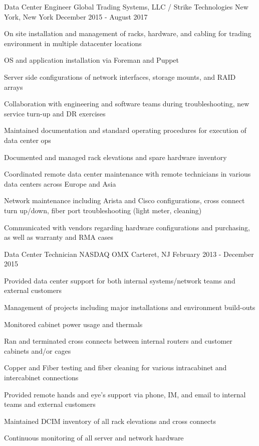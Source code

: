 \begin{cventries}
	\cventry
	{Data Center Engineer}
	{Global Trading Systems, LLC / Strike Technologies}
	{New York, New York}
	{December 2015 - August 2017}
	{
		\begin{cvitems}
		\item {On site installation and management of racks, hardware, and cabling for trading environment in multiple datacenter locations}
		\item {OS and application installation via Foreman and Puppet}
		\item {Server side configurations of network interfaces, storage mounts, and RAID arrays}
		\item {Collaboration with engineering and software teams during troubleshooting, new service turn-up and DR exercises}
		\item {Maintained documentation and standard operating procedures for execution of data center ops}
		\item {Documented and managed rack elevations and spare hardware inventory}
		\item {Coordinated remote data center maintenance with remote technicians in various data centers across Europe and Asia}
		\item {Network maintenance including Arista and Cisco configurations, cross connect turn up/down, fiber port troubleshooting (light meter, cleaning)}
  		\item {Communicated with vendors regarding hardware configurations and purchasing, as well as warranty and RMA cases}
		\end{cvitems}
	}


	\cventry
	{Data Center Technician}
	{NASDAQ OMX}
	{Carteret, NJ}
	{February 2013 - December 2015}
	{
		\begin{cvitems}
		\item {Provided data center support for both internal systems/network teams and external customers}
		\item {Management of projects including major installations and environment build-outs}
  		\item {Monitored cabinet power usage and thermals}
		\item {Ran and terminated cross connects between internal routers and customer cabinets and/or cages}
		\item {Copper and Fiber testing and fiber cleaning for various intracabinet and intercabinet connections}
		\item {Provided remote hands and eye's support via phone, IM, and email to internal teams and external customers}
		\item {Maintained DCIM inventory of all rack elevations and cross connects}
		\item {Continuous monitoring of all server and network hardware}
		\end{cvitems}
	}

\end{cventries}
